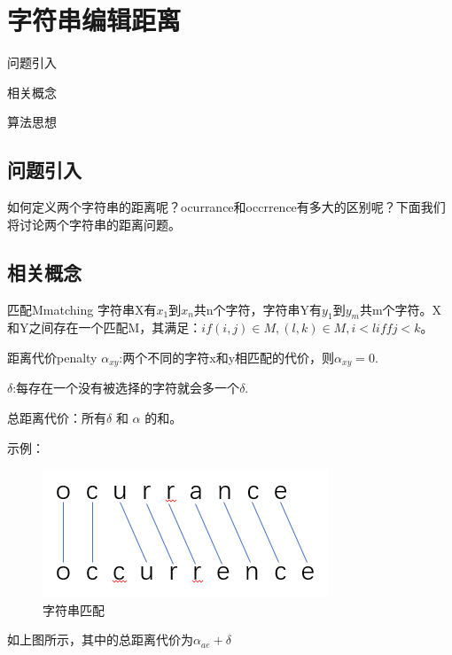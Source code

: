 \chapter{字符串编辑距离}

\begin{introduction}
	\item 问题引入
	\item 相关概念
	\item 算法思想
\end{introduction}

\section{问题引入}
如何定义两个字符串的距离呢？ocurrance和occrrence有多大的区别呢？下面我们将讨论两个字符串的距离问题。
\section{相关概念}
\begin{definition}{匹配M}{matching}
	字符串X有$x_1$到$x_n$共n个字符，字符串Y有$y_1$到$y_m$共m个字符。X和Y之间存在一个匹配M，其满足：$if (i,j) \in M, (l,k)\in M, i<l iff j<k$。
\end{definition}





\begin{definition}{距离代价}{penalty}
	$\alpha_{xy}$:两个不同的字符x和y相匹配的代价，则$\alpha_{xy}=0$.
	
	$\delta$:每存在一个没有被选择的字符就会多一个$\delta$.
	
	总距离代价：所有$\delta$ 和 $\alpha$ 的和。
\end{definition}

示例：

\begin{figure}[htb]
	\centering
	\includegraphics[scale=0.6]{image/connect1.png}
	\caption{字符串匹配}\label{fig:connect1}
\end{figure}
如上图所示，其中的总距离代价为$\alpha_{ae} + \delta$

